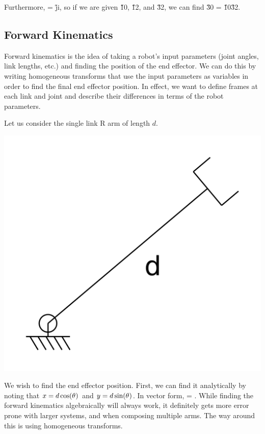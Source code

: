 \documentclass{16384_doc}
\begin{document}
Furthermore,  = \H{j}{i}, so if we are given \H{1}{0}, \H{1}{2},
and \H{3}{2}, we can find \H{3}{0} = \H{1}{0}\H{3}{2}.

\subsection{Forward Kinematics}

Forward kinematics is the idea of taking a robot's input parameters (joint
angles, link lengths, etc.) and finding the position of the end effector. We can do
this by writing homogeneous transforms that use the input parameters as
variables in order to find the final end effector position.  In effect, we want
to define frames at each link and joint and describe their differences in terms
of the robot parameters.

Let us consider the single link R arm of length $d$.
\begin{center}
\includegraphics[scale=0.08]{generated_figures/bg_r_robot.png}
\end{center}

We wish to find the end effector position.  First, we can find it analytically
by noting that $x = d \cos(\theta_{})$ and $y = d \sin(\theta_{})$.  In vector form,
 = .  While finding the forward
kinematics algebraically will always work, it definitely gets more error prone
with larger systems, and when composing multiple arms.  The way around this is using
homogeneous transforms.
\end{document}

